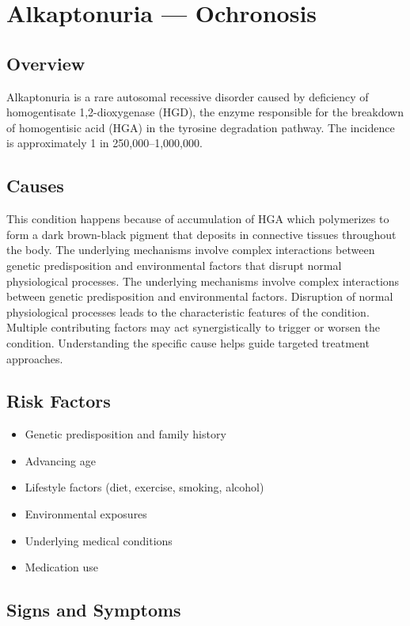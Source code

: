 \chapter{Alkaptonuria --- Ochronosis}
\label{sec:Alkaptonuria}

\section{Overview}
Alkaptonuria is a rare autosomal recessive disorder caused by deficiency of homogentisate 1,2-dioxygenase (HGD), the enzyme responsible for the breakdown of homogentisic acid (HGA) in the tyrosine degradation pathway. The incidence is approximately 1 in 250,000--1,000,000.
\section{Causes}
This condition happens because of accumulation of HGA which polymerizes to form a dark brown-black pigment that deposits in connective tissues throughout the body. The underlying mechanisms involve complex interactions between genetic predisposition and environmental factors that disrupt normal physiological processes. The underlying mechanisms involve complex interactions between genetic predisposition and environmental factors. Disruption of normal physiological processes leads to the characteristic features of the condition. Multiple contributing factors may act synergistically to trigger or worsen the condition. Understanding the specific cause helps guide targeted treatment approaches.
\section{Risk Factors}


\begin{itemize}[noitemsep]
  \item Genetic predisposition and family history
  \item Advancing age
  \item Lifestyle factors (diet, exercise, smoking, alcohol)
  \item Environmental exposures
  \item Underlying medical conditions
  \item Medication use
\end{itemize}
\section{Signs and Symptoms}

